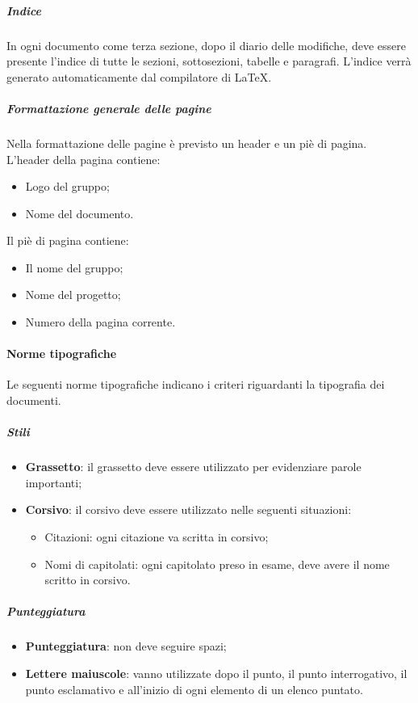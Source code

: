 \documentclass[../NormeDiProgetto_v4.0.0.tex]{subfiles}
\begin{document}
				\subparagraph{Indice}
				In ogni documento come terza sezione, dopo il diario delle modifiche, deve essere presente l'indice di tutte le sezioni, sottosezioni, tabelle e paragrafi.
				L'indice verrà generato automaticamente dal compilatore di \LaTeX .

				\subparagraph{Formattazione generale delle pagine}
				Nella formattazione delle pagine è previsto un header e un piè di pagina.
				L'header della pagina contiene:
				\begin{itemize}
					\item Logo del gruppo;
					\item Nome del documento.
				\end{itemize}
				Il piè di pagina contiene:
				\begin{itemize}
				\item Il nome del gruppo;
				\item Nome del progetto;
				\item Numero della pagina corrente.
				\end{itemize}

			\paragraph{Norme tipografiche}
				Le seguenti norme tipografiche indicano i criteri riguardanti la tipografia dei documenti.

				\subparagraph{Stili}
				\begin{itemize}
				\item \textbf{Grassetto}: il grassetto deve essere utilizzato per evidenziare parole importanti;
				\item \textbf{Corsivo}: il corsivo deve essere utilizzato nelle seguenti
				situazioni:
				\begin{itemize}
					\item Citazioni: ogni citazione va scritta in corsivo;
					\item Nomi di capitolati: ogni capitolato preso in esame, deve avere il nome scritto in corsivo.
				\end{itemize}
				\end{itemize}

				\subparagraph{Punteggiatura}
				\begin{itemize}
				\item \textbf{Punteggiatura}: non deve seguire spazi;
				\item \textbf{Lettere maiuscole}: vanno utilizzate dopo il punto, il punto interrogativo,
				il punto esclamativo e all'inizio di ogni elemento di un elenco puntato.
				\end{itemize}
\end{document}
